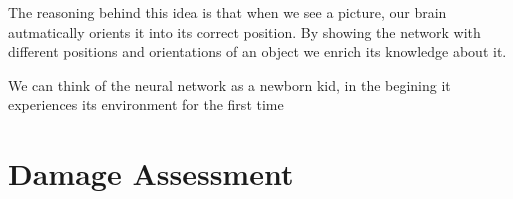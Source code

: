 The reasoning behind this idea is that when we see a picture, our brain autmatically orients it into its correct position. By showing the network with different positions and orientations of an object we enrich its knowledge about it.

We can think of the neural network as a newborn kid, in the begining it experiences its environment for the first time



\section{Damage Assessment}


